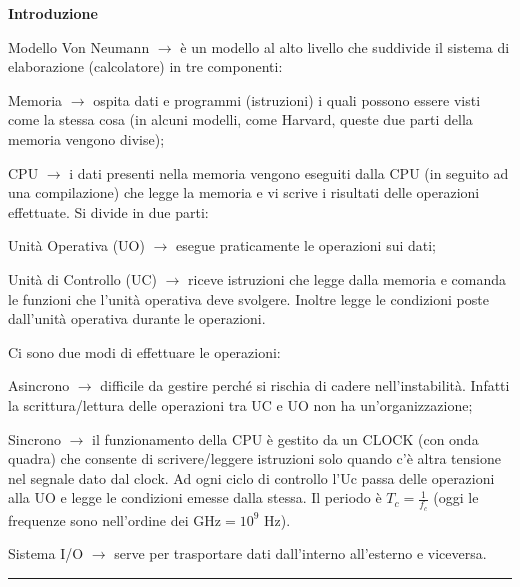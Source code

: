 \documentclass[8pt]{extarticle}
\newenvironment{formulario}
{
\setlength{\columnsep}{3em}
\twocolumn
\lstset{tabsize=3}
\begin{spacing}{1}
\begin{flushleft}
}{
\end{flushleft}
\end{spacing}
}
\newenvironment{tcenter}{
  \par
  \centering
  \setlength{\parskip}{0pt} %
  \noindent
}{
  \par
}
\newenvironment{Descr}
{
	\begin{description}[topsep=0pt,itemsep=0pt,partopsep=0pt, parsep=0pt]
}{
	\end{description}
}
\newenvironment{myParagraph}[1]
{
\begin{tcenter}
\textbf{#1}
\end{tcenter}
}{
\myRule
}
\newcommand{\myRule}{\rule{250pt}{0.1pt}}
\newcommand{\ra}{\rightarrow}
\begin{document}
\begin{formulario}


	\begin{myParagraph}{Introduzione}
		\begin{Descr}
			\item[Modello Von Neumann] $\ra$ è un modello al alto livello che suddivide il sistema di elaborazione (calcolatore) in tre componenti:
			\begin{Descr}
				\item[Memoria]  $\ra$ ospita dati e programmi (istruzioni) i quali possono essere visti come la stessa cosa (in alcuni modelli, come Harvard, queste due parti della memoria vengono divise);
				 \item[CPU]  $\ra$ i dati presenti nella memoria vengono eseguiti dalla CPU (in seguito ad una compilazione) che legge la memoria e vi scrive i risultati delle operazioni effettuate. Si divide in due parti:
				\begin{Descr}
					\item[Unità Operativa (UO)]  $\ra$ esegue praticamente le operazioni sui dati;
					\item[Unità di Controllo (UC)]  $\ra$ riceve istruzioni che legge dalla memoria e comanda le funzioni che l'unità operativa deve svolgere. Inoltre legge le condizioni poste dall'unità operativa durante le operazioni.
				\end{Descr}
				Ci sono due modi di effettuare le operazioni:
		\begin{Descr}
			\item[Asincrono] $\ra$ difficile da gestire perché si rischia di cadere nell'instabilità. Infatti la scrittura/lettura delle operazioni tra UC e UO non ha un'organizzazione;
			\item[Sincrono] $\ra$ il funzionamento della CPU è gestito da un CLOCK (con onda quadra) che consente di scrivere/leggere istruzioni solo quando c'è altra tensione nel segnale dato dal clock. Ad ogni ciclo di controllo l'Uc passa delle operazioni alla UO e legge le condizioni emesse dalla stessa. Il periodo è $T_c=\frac{1}{f_c}$ (oggi le frequenze sono nell'ordine dei $\text{GHz}=10^9 \text{ Hz}$). 
		\end{Descr}	
				\item[Sistema I/O]  $\ra$ serve per trasportare dati dall'interno all'esterno e viceversa.
			\end{Descr}
		\end{Descr}
	\end{myParagraph}
	
	
\end{formulario}
\end{document}
